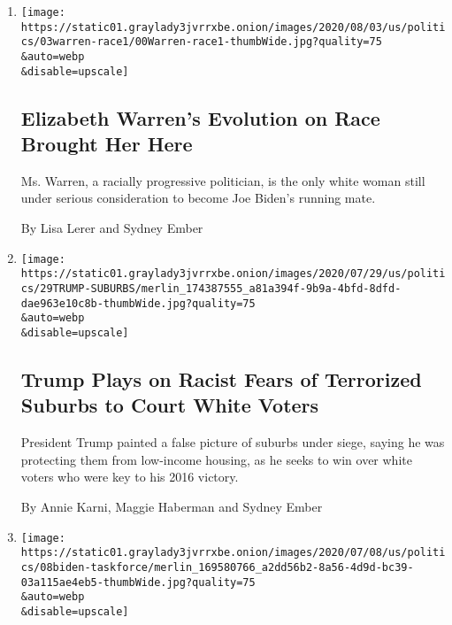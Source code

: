 \begin{enumerate}
\def\labelenumi{\arabic{enumi}.}
\item
  \href{/2020/08/02/us/politics/elizabeth-warren-biden-vice-president.html}{}

  \texttt{[image: https://static01.graylady3jvrrxbe.onion/images/2020/08/03/us/politics/03warren-race1/00Warren-race1-thumbWide.jpg?quality=75\\\&auto=webp\\\&disable=upscale]}

  \hypertarget{elizabeth-warrens-evolution-on-race-brought-her-here}{%
  \subsection{Elizabeth Warren's Evolution on Race Brought Her
  Here}\label{elizabeth-warrens-evolution-on-race-brought-her-here}}

  Ms. Warren, a racially progressive politician, is the only white woman
  still under serious consideration to become Joe Biden's running mate.

  By Lisa Lerer and Sydney Ember
\item
  \href{/2020/07/29/us/politics/trump-suburbs-housing-white-voters.html}{}

  \texttt{[image: https://static01.graylady3jvrrxbe.onion/images/2020/07/29/us/politics/29TRUMP-SUBURBS/merlin\_174387555\_a81a394f-9b9a-4bfd-8dfd-dae963e10c8b-thumbWide.jpg?quality=75\\\&auto=webp\\\&disable=upscale]}

  \hypertarget{trump-plays-on-racist-fears-of-terrorized-suburbs-to-court-white-voters}{%
  \subsection{Trump Plays on Racist Fears of Terrorized Suburbs to Court
  White
  Voters}\label{trump-plays-on-racist-fears-of-terrorized-suburbs-to-court-white-voters}}

  President Trump painted a false picture of suburbs under siege, saying
  he was protecting them from low-income housing, as he seeks to win
  over white voters who were key to his 2016 victory.

  By Annie Karni, Maggie Haberman and Sydney Ember
\item
  \href{/2020/07/08/us/politics/biden-bernie-sanders.html}{}

  \texttt{[image: https://static01.graylady3jvrrxbe.onion/images/2020/07/08/us/politics/08biden-taskforce/merlin\_169580766\_a2dd56b2-8a56-4d9d-bc39-03a115ae4eb5-thumbWide.jpg?quality=75\\\&auto=webp\\\&disable=upscale]}


\end{enumerate}
